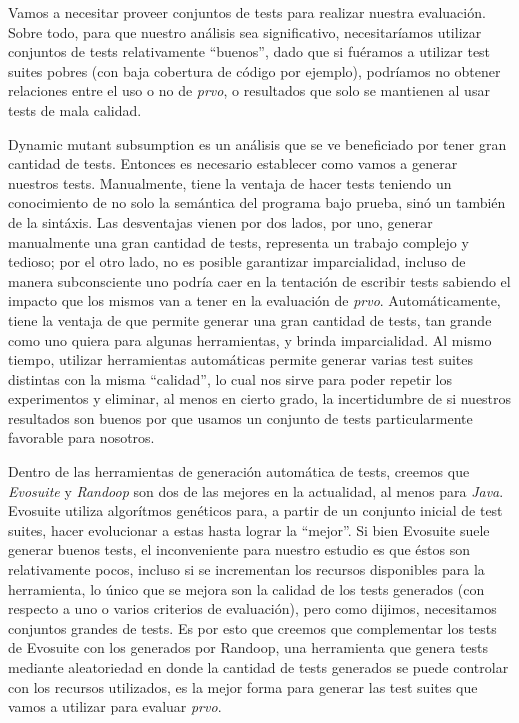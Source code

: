 Vamos a necesitar proveer conjuntos de tests para realizar nuestra evaluaci\'on. Sobre todo, para que nuestro an\'alisis sea significativo, necesitar\'iamos utilizar conjuntos de tests relativamente ``buenos'', dado que si fu\'eramos a utilizar test suites pobres (con baja cobertura de c\'odigo por ejemplo), podr\'iamos no obtener relaciones entre el uso o no de \emph{prvo}, o resultados que solo se mantienen al usar tests de mala calidad.

Dynamic mutant subsumption es un an\'alisis que se ve beneficiado por tener gran cantidad de tests. Entonces es necesario establecer como vamos a generar nuestros tests. Manualmente, tiene la ventaja de hacer tests teniendo un conocimiento de no solo la sem\'antica del programa bajo prueba, sin\'o un tambi\'en de la sint\'axis. Las desventajas vienen por dos lados, por uno, generar manualmente una gran cantidad de tests, representa un trabajo complejo y tedioso; por el otro lado, no es posible garantizar imparcialidad, incluso de manera subconsciente uno podr\'ia caer en la tentaci\'on de escribir tests sabiendo el impacto que los mismos van a tener en la evaluaci\'on de \emph{prvo}. Autom\'aticamente, tiene la ventaja de que permite generar una gran cantidad de tests, tan grande como uno quiera para algunas herramientas, y brinda imparcialidad. Al mismo tiempo, utilizar herramientas autom\'aticas permite generar varias test suites distintas con la misma ``calidad'', lo cual nos sirve para poder repetir los experimentos y eliminar, al menos en cierto grado, la incertidumbre de si nuestros resultados son buenos por que usamos un conjunto de tests particularmente favorable para nosotros. 

Dentro de las herramientas de generaci\'on autom\'atica de tests, creemos que \emph{Evosuite} y \emph{Randoop} son dos de las mejores en la actualidad, al menos para \emph{Java}. Evosuite utiliza algor\'itmos gen\'eticos para, a partir de un conjunto inicial de test suites, hacer evolucionar a estas hasta lograr la ``mejor''. Si bien Evosuite suele generar buenos tests, el inconveniente para nuestro estudio es que \'estos son relativamente pocos, incluso si se incrementan los recursos disponibles para la herramienta, lo \'unico que se mejora son la calidad de los tests generados (con respecto a uno o varios criterios de evaluaci\'on), pero como dijimos, necesitamos conjuntos grandes de tests. Es por esto que creemos que complementar los tests de Evosuite con los generados por Randoop, una herramienta que genera tests mediante aleatoriedad en donde la cantidad de tests generados se puede controlar con los recursos utilizados, es la mejor forma para generar las test suites que vamos a utilizar para evaluar \emph{prvo}.

